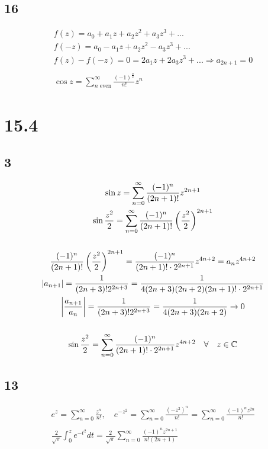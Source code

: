 \subsection*{16}


\begin{gather*}
	f(z) = a_0 + a_1 z + a_2 z^2 + a_3 z^3 + ...
	\\
	f(-z) = a_0 - a_1 z + a_2 z^2 - a_3 z^3 + ...
	\\
	f(z) - f(-z) = 0 = 2 a_1 z + 2 a_3 z^3 + ... \Rightarrow a_{2n + 1} = 0
	\\
	\\
	\cos{z} = \sum_{n \text{ even}}^\infty{\frac{(-1)^{\frac{n}{2}}}{n!} z^{n}}
\end{gather*}


\section*{15.4}

\subsection*{3}


\begin{gather*}
	\sin{z} = \sum_{n = 0}^{\infty}{\frac{(-1)^n}{(2 n + 1)!} z^{2n + 1}}
	\\
	\sin{\frac{z^2}{2}} = \sum_{n = 0}^\infty{\frac{(-1)^n}{(2n + 1)!} \left( \frac{z^2}{2} \right)^{2 n + 1}}
	\\
	\\
	\frac{(-1)^n}{(2n + 1)!} \left( \frac{z^2}{2} \right)^{2 n + 1}
	=
	\frac{(-1)^n}{(2n + 1)! \cdot 2^{2n + 1}} z^{4 n + 2}
	=
	a_n z^{4n + 2}
	\\
	\left| a_{n + 1} \right| = \frac{1}{(2n + 3)! 2^{2n + 3}} = \frac{1}{4 (2n + 3)(2n + 2)(2n + 1)! \cdot 2^{2n + 1}}
	\\
	\left| \frac{a_{n + 1}}{a_n} \right| = \frac{1}{(2n + 3)! 2^{2n + 3}} = \frac{1}{4 (2n + 3)(2n + 2)} \rightarrow 0
	\\
	\\
	\sin{\frac{z^2}{2}} = \sum_{n = 0}^\infty{\frac{(-1)^n}{(2n + 1)! \cdot 2^{2n + 1}} z^{4 n + 2}} \quad \forall \quad z \in \mathbb{C}
\end{gather*}


\subsection*{13}


\begin{gather*}
	e^{z} = \sum_{n = 0}^\infty{\frac{z^n}{n!}},
	\quad
	e^{-z^2} = \sum_{n = 0}^\infty{\frac{(-z^2)^n}{n!}} = \sum_{n = 0}^\infty{\frac{(-1)^n z^{2n}}{n!}}
	\\
	\\
	\frac{2}{\sqrt{\pi}} \int_0^z{e^{-t^2} dt} = \frac{2}{\sqrt{\pi}} \sum_{n = 0}^\infty{\frac{(-1)^n z^{2n + 1}}{n! (2n + 1)}}
\end{gather*}


